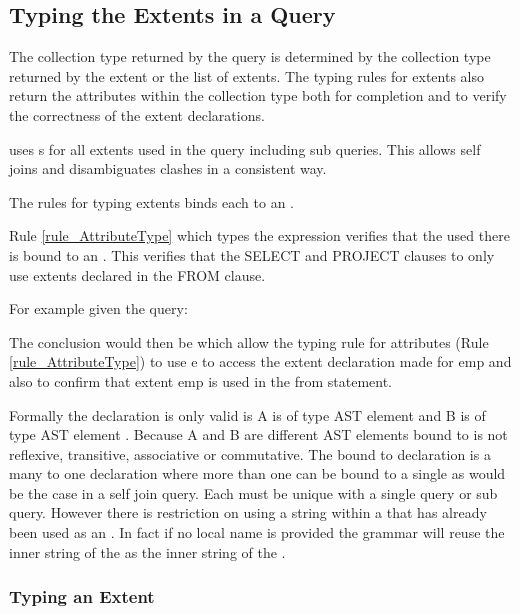 \subsection{Typing the Extents in a Query}
\label{sec_extentListType}
The collection type returned by the query is determined by the collection type returned by the extent or the list of extents.
The typing rules for extents also return the attributes within the collection type both for completion and to verify the correctness of the extent declarations.

\SNEEql uses s for all extents used in the query including sub queries. 
This allows self joins and disambiguates  clashes in a consistent way.

The rules for typing extents binds each  to an .

Rule \ref{rule_AttributeType} which types the  expression verifies that the  used there is bound to an . 
This verifies that the SELECT and PROJECT clauses to only use extents declared in the FROM clause.

For example given the query:


The conclusion would then be  which allow the typing rule for attributes (Rule \ref{rule_AttributeType}) to use e to access the extent declaration made for emp and also to confirm that extent emp is used in the from statement.

Formally the declaration  is only valid is A is of type AST element  and B is of type AST element . Because A and B are different AST elements bound to is not reflexive, transitive, associative or commutative. 
The bound to declaration is a many to one declaration where more than one  can be bound to a single  as would be the case in a self join query.
Each  must be unique with a single query or sub query.
However there is restriction on using a string within a  that has already been used as an .
In fact if no local name is provided the grammar will reuse the inner string of the  as the inner string of the .
\subsubsection{Typing an Extent}
 
